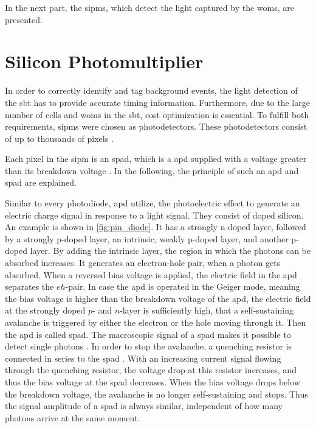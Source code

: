 In the next part, the \acp{sipm}, which detect the light captured by the \acp{wom}, are presented.


\section{Silicon Photomultiplier}
In order to correctly identify and tag background events, the light detection of the \ac{sbt} has to provide accurate timing information.
Furthermore, due to the large number of cells and \acp{wom} in the \ac{sbt}, cost optimization is essential.
To fulfill both requirements, \acp{sipm} were chosen as photodetectors.
These photodetectors consist of up to thousands of pixels \cite{ACERBI201916}.

Each pixel in the \ac{sipm} is an \ac{spad}, which is a \ac{apd} supplied with a voltage greater than its breakdown voltage \cite{HamamatsuMPPCLit}.
In the following, the principle of such an \ac{apd} and \ac{spad} are explained.

Similar to every photodiode, \ac{apd} utilize, the photoelectric effect to generate an electric charge signal in response to a light signal.
They consist of doped silicon.
An example is shown in \autoref{fig:pin_diode}.
It has a strongly n-doped layer, followed by a strongly p-doped layer, an intrinsic, weakly p-doped layer, and another p-doped layer.
By adding the intrinsic layer, the region in which the photons can be absorbed increases.
It generates an electron-hole pair, when a photon gets absorbed.
When a reversed bias voltage is applied, the electric field in the \ac{apd} separates the $eh$-pair.
In case the \ac{apd} is operated in the Geiger mode, meaning the bias voltage is higher than the breakdown voltage of the \ac{apd}, the electric field at the strongly doped $p$- and $n$-layer is sufficiently high, that a self-sustaining avalanche is triggered by either the electron or the hole moving through it.
Then the \ac{apd} is called \ac{spad}.
The macroscopic signal of a \ac{spad} makes it possible to detect single photons \cite{Kolanoski}.
In order to stop the avalanche, a quenching resistor is connected in series to the \ac{spad} \cite{ACERBI201916}.
With an increasing current signal flowing through the quenching resistor, the voltage drop at this resistor increases, and thus the bias voltage at the \ac{spad} decreases.
When the bias voltage drops below the breakdown voltage, the avalanche is no longer self-sustaining and stops.
Thus the signal amplitude of a \ac{spad} is always similar, independent of how many photons arrive at the same moment.



